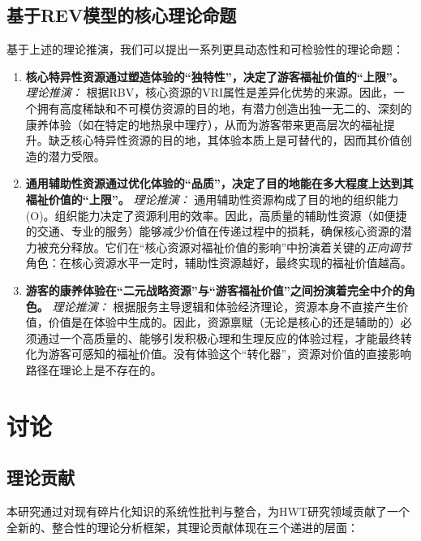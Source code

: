 \documentclass[UTF8, 12pt, a4paper, twoside]{ctexart}
\begin{document}
\subsection{基于REV模型的核心理论命题}
基于上述的理论推演，我们可以提出一系列更具动态性和可检验性的理论命题：
\begin{enumerate}[label=\textbf{命题 \arabic*:}, leftmargin=*, wide]
	\item \textbf{核心特异性资源通过塑造体验的“独特性”，决定了游客福祉价值的“上限”。}
    \textit{理论推演：} 根据RBV，核心资源的VRI属性是差异化优势的来源。因此，一个拥有高度稀缺和不可模仿资源的目的地，有潜力创造出独一无二的、深刻的康养体验（如在特定的地热泉中理疗），从而为游客带来更高层次的福祉提升。缺乏核心特异性资源的目的地，其体验本质上是可替代的，因而其价值创造的潜力受限。

	\item \textbf{通用辅助性资源通过优化体验的“品质”，决定了目的地能在多大程度上达到其福祉价值的“上限”。}
    \textit{理论推演：} 通用辅助性资源构成了目的地的组织能力(O)。组织能力决定了资源利用的效率。因此，高质量的辅助性资源（如便捷的交通、专业的服务）能够减少价值在传递过程中的损耗，确保核心资源的潜力被充分释放。它们在“核心资源对福祉价值的影响”中扮演着关键的\textit{正向调节}角色：在核心资源水平一定时，辅助性资源越好，最终实现的福祉价值越高。

	\item \textbf{游客的康养体验在“二元战略资源”与“游客福祉价值”之间扮演着完全中介的角色。}
    \textit{理论推演：} 根据服务主导逻辑和体验经济理论，资源本身不直接产生价值，价值是在体验中生成的。因此，资源禀赋（无论是核心的还是辅助的）必须通过一个高质量的、能够引发积极心理和生理反应的体验过程，才能最终转化为游客可感知的福祉价值。没有体验这个“转化器”，资源对价值的直接影响路径在理论上是不存在的。
\end{enumerate}


\section{讨论}
\subsection{理论贡献}
本研究通过对现有碎片化知识的系统性批判与整合，为HWT研究领域贡献了一个全新的、整合性的理论分析框架，其理论贡献体现在三个递进的层面：
\end{document}
